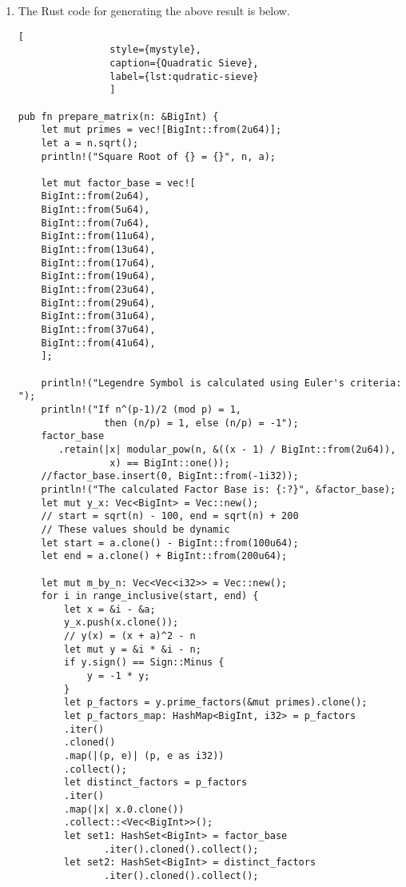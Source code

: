 \documentclass[11pt,a4paper,fleqn]{article}
\makeatletter
\newcommand{\tpmod}[1]{{\@displayfalse\pmod{#1}}}
\newcommand{\qedn}{\tag*{$\blacksquare$}}
\makeatother
\begin{document}
\begin{enumerate}[1.]
\begin{flushleft}
\begin{enumerate}[Step 1.]
\begin{align*}
                    &v = -1 \times 2 \times 5^3 \times 19 \tpmod{23861} \\
                    &  = 19111\\
                    & u^2 \equiv v^2 \tpmod{23861} \implies gcd(d, u-v) and gcd(d, u+v) are factors of d\\
                    & gcd(23861, 19111 - 18576) = 107 \\
                    & gcd(23861, 19111 + 18576) = 223\\\
                    &   \therefore 23861 = 101 \times 223
                    \hfill\qedn
                \end{align*}
                \item The Rust code for generating the above result is below.
                \begin{lstlisting}[
                style={mystyle},
                caption={Quadratic Sieve},
                label={lst:qudratic-sieve}
                ]

pub fn prepare_matrix(n: &BigInt) {
    let mut primes = vec![BigInt::from(2u64)];
    let a = n.sqrt();
    println!("Square Root of {} = {}", n, a);

    let mut factor_base = vec![
    BigInt::from(2u64),
    BigInt::from(5u64),
    BigInt::from(7u64),
    BigInt::from(11u64),
    BigInt::from(13u64),
    BigInt::from(17u64),
    BigInt::from(19u64),
    BigInt::from(23u64),
    BigInt::from(29u64),
    BigInt::from(31u64),
    BigInt::from(37u64),
    BigInt::from(41u64),
    ];

    println!("Legendre Symbol is calculated using Euler's criteria: ");
    println!("If n^(p-1)/2 (mod p) = 1,
               then (n/p) = 1, else (n/p) = -1");
    factor_base
       .retain(|x| modular_pow(n, &((x - 1) / BigInt::from(2u64)),
                x) == BigInt::one());
    //factor_base.insert(0, BigInt::from(-1i32));
    println!("The calculated Factor Base is: {:?}", &factor_base);
    let mut y_x: Vec<BigInt> = Vec::new();
    // start = sqrt(n) - 100, end = sqrt(n) + 200
    // These values should be dynamic
    let start = a.clone() - BigInt::from(100u64);
    let end = a.clone() + BigInt::from(200u64);

    let mut m_by_n: Vec<Vec<i32>> = Vec::new();
    for i in range_inclusive(start, end) {
        let x = &i - &a;
        y_x.push(x.clone());
        // y(x) = (x + a)^2 - n
        let mut y = &i * &i - n;
        if y.sign() == Sign::Minus {
            y = -1 * y;
        }
        let p_factors = y.prime_factors(&mut primes).clone();
        let p_factors_map: HashMap<BigInt, i32> = p_factors
        .iter()
        .cloned()
        .map(|(p, e)| (p, e as i32))
        .collect();
        let distinct_factors = p_factors
        .iter()
        .map(|x| x.0.clone())
        .collect::<Vec<BigInt>>();
        let set1: HashSet<BigInt> = factor_base
               .iter().cloned().collect();
        let set2: HashSet<BigInt> = distinct_factors
               .iter().cloned().collect();


\end{lstlisting}
\end{enumerate}
\end{flushleft}
\end{enumerate}
\end{document}
